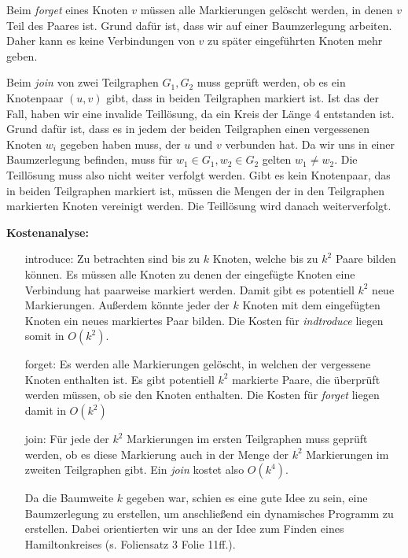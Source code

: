 Beim \textit{forget} eines Knoten $v$ müssen alle Markierungen gelöscht werden, in denen $v$ Teil des Paares ist. Grund dafür ist, dass wir auf einer Baumzerlegung arbeiten. Daher kann es keine Verbindungen von $v$ zu später eingeführten Knoten mehr geben.

Beim \textit{join} von zwei Teilgraphen $G_1, G_2$ muss geprüft werden, ob es ein Knotenpaar $(u,v)$ gibt, dass in beiden Teilgraphen markiert ist. Ist das der Fall, haben wir eine invalide Teillösung, da ein Kreis der Länge 4 entstanden ist. Grund dafür ist, dass es in jedem der beiden Teilgraphen einen vergessenen Knoten $w_i$ gegeben haben muss, der $u$ und $v$ verbunden hat. Da wir uns in einer Baumzerlegung befinden, muss für $w_1\in G_1, w_2\in G_2$ gelten $w_1\neq w_2$. Die Teillösung muss also nicht weiter verfolgt werden. Gibt es kein Knotenpaar, das in beiden Teilgraphen markiert ist, müssen die Mengen der in den Teilgraphen markierten Knoten vereinigt werden. Die Teillösung wird danach weiterverfolgt.

\textbf{Kostenanalyse: }
\begin{itemize}
\item[introduce:] Zu betrachten sind bis zu $k$ Knoten, welche bis zu $k^2$ Paare bilden können. Es müssen alle Knoten zu denen der eingefügte Knoten eine Verbindung hat paarweise markiert werden. Damit gibt es potentiell $k^2$ neue Markierungen. Außerdem könnte jeder der $k$ Knoten mit dem eingefügten Knoten ein neues markiertes Paar bilden. Die Kosten für \textit{indtroduce} liegen somit in $O(k^2)$.
\item[forget:] Es werden alle Markierungen gelöscht, in welchen der vergessene Knoten enthalten ist. Es gibt potentiell $k^2$ markierte Paare, die überprüft werden müssen, ob sie den Knoten enthalten. Die Kosten für \textit{forget} liegen damit in $O(k^2)$
\item[join:] Für jede der $k^2$ Markierungen im ersten Teilgraphen muss geprüft werden, ob es diese Markierung auch in der Menge der $k^2$ Markierungen im zweiten Teilgraphen gibt. Ein \textit{join} kostet also $O(k^4)$.


\how

Da die Baumweite $k$ gegeben war, schien es eine gute Idee zu sein, eine Baumzerlegung zu erstellen, um anschließend ein dynamisches Programm zu erstellen. Dabei orientierten wir uns an der Idee zum Finden eines Hamiltonkreises (s. Foliensatz 3 Folie 11ff.). 

\end{itemize}



